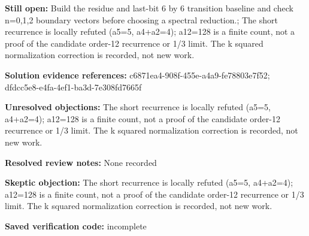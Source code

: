 \documentclass[11pt]{article}
\begin{document}
\textbf{Still open:} Build the residue and last-bit 6 by 6 transition baseline and check n=0,1,2 boundary vectors before choosing a spectral reduction.; The short recurrence is locally refuted (a5=5, a4+a2=4); a12=128 is a finite count, not a proof of the candidate order-12 recurrence or 1/3 limit. The k squared normalization correction is recorded, not new work.\par
\textbf{Solution evidence references:} c6871ea4-908f-455e-a4a9-fe78803e7f52; dfdcc5e8-e4fa-4ef1-ba3d-7e308fd7665f\par
\textbf{Unresolved objections:} The short recurrence is locally refuted (a5=5, a4+a2=4); a12=128 is a finite count, not a proof of the candidate order-12 recurrence or 1/3 limit. The k squared normalization correction is recorded, not new work.\par
\textbf{Resolved review notes:} None recorded\par
\textbf{Skeptic objection:} The short recurrence is locally refuted (a5=5, a4+a2=4); a12=128 is a finite count, not a proof of the candidate order-12 recurrence or 1/3 limit. The k squared normalization correction is recorded, not new work.\par
\textbf{Saved verification code:} incomplete\par
\end{document}
